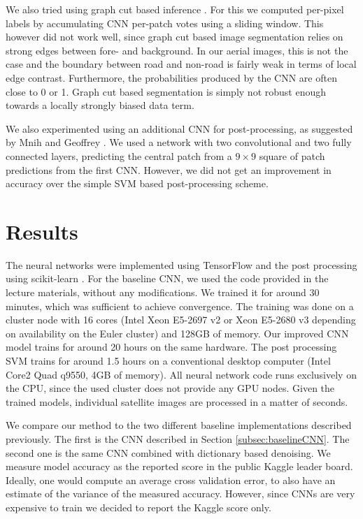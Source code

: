 \documentclass[10pt,conference,compsocconf]{IEEEtran}
\begin{document}
\par
We also tried using graph cut based inference \cite{Boykov.2001}. For this we computed per-pixel labels by accumulating CNN per-patch votes using a sliding window. This however did not work well, since graph cut based image segmentation relies on strong edges between fore- and background. In our aerial images, this is not the case and the boundary between road and non-road is fairly weak in terms of local edge contrast. Furthermore, the probabilities produced by the CNN are often close to 0 or 1. Graph cut based segmentation is simply not robust enough towards a locally strongly biased data term.

\par 
We also experimented using an additional CNN for post-processing, as suggested by Mnih and Geoffrey \cite{Mnih.2010}. We used a network with two convolutional and two fully connected layers, predicting the central patch from a $ 9 \times 9 $ square of patch predictions from the first CNN. However, we did not get an improvement in accuracy over the simple SVM based post-processing scheme.

\section{Results}
\label{sec:results}
The neural networks were implemented using TensorFlow \cite{tensorflow.2015} and the post processing using scikit-learn \cite{sklearn.2011}. For the baseline CNN, we used the code provided in the lecture materials, without any modifications. We trained it for around 30 minutes, which was sufficient to achieve convergence. The training was done on a cluster node with 16 cores (Intel Xeon E5-2697 v2 or Xeon E5-2680 v3 depending on availability on the Euler cluster) and 128GB of memory. Our improved CNN model trains for around 20 hours on the same hardware. The post processing SVM trains for around 1.5 hours on a conventional desktop computer (Intel Core2 Quad q9550, 4GB of memory). All neural network code runs exclusively on the CPU, since the used cluster does not provide any GPU nodes. Given the trained models, individual satellite images are processed in a matter of seconds.

\par 
We compare our method to the two different baseline implementations described previously. The first is the CNN described in Section \ref{subsec:baselineCNN}. The second one is the same CNN combined with dictionary based denoising. We measure model accuracy as the reported score in the public Kaggle leader board. Ideally, one would compute an average cross validation error, to also have an estimate of the variance of the measured accuracy. However, since CNNs are very expensive to train we decided to report the Kaggle score only.
\end{document}
